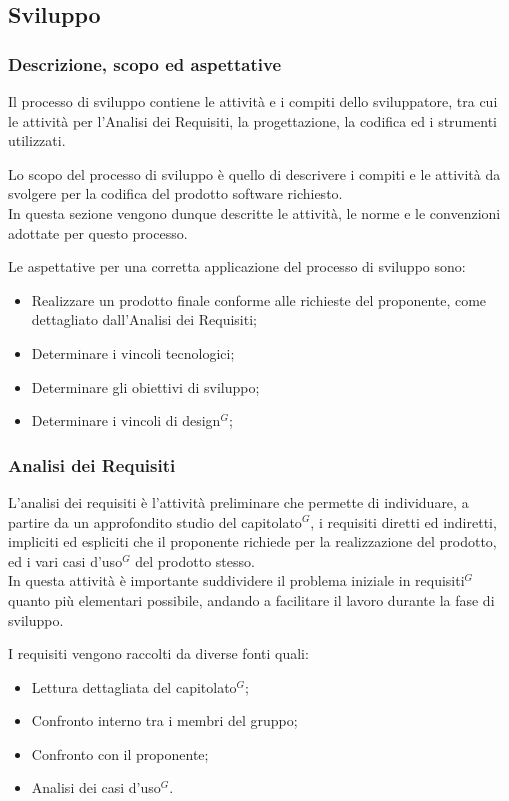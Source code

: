 \subsection{Sviluppo}

\subsubsection{Descrizione, scopo ed aspettative}

Il processo di sviluppo contiene le attività e i compiti dello sviluppatore, tra cui le attività per l’Analisi dei Requisiti, la progettazione, la codifica ed i strumenti utilizzati.

Lo scopo del processo di sviluppo è quello di descrivere i compiti e le attività da svolgere per la codifica del prodotto software richiesto. \\
In questa sezione vengono dunque descritte le attività, le norme e le convenzioni adottate per questo processo.

Le aspettative per una corretta applicazione del processo di sviluppo sono:
\begin{itemize}
    \item Realizzare un prodotto finale conforme alle richieste del proponente, come dettagliato dall'Analisi dei Requisiti;
    \item Determinare i vincoli tecnologici;
    \item Determinare gli obiettivi di sviluppo;
    \item Determinare i vincoli di design$^{G}$;
\end{itemize}
\subsubsection{Analisi dei Requisiti}


L’analisi dei requisiti è l’attività preliminare che permette di individuare, a partire da un approfondito studio del capitolato$^{G}$, i requisiti diretti ed indiretti, 
impliciti ed espliciti che il proponente richiede per la realizzazione del prodotto, ed i vari casi d’uso$^{G}$ del prodotto stesso. \\
In questa attività è importante suddividere il problema iniziale in requisiti$^{G}$ quanto più elementari possibile, andando a facilitare il lavoro durante la fase di sviluppo.

\pagebreak

    I requisiti vengono raccolti da diverse fonti quali:
    \begin{itemize}
        \item Lettura dettagliata del capitolato$^{G}$;
        \item Confronto interno tra i membri del gruppo;
        \item Confronto con il proponente;
        \item Analisi dei casi d’uso$^{G}$.
    \end{itemize}

